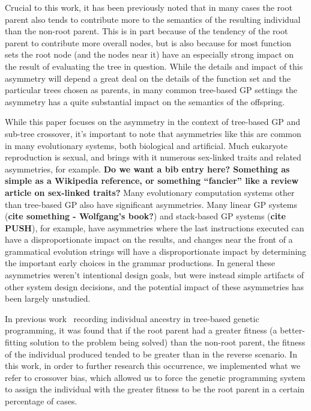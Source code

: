 \documentclass{sig-alternate}
\begin{document}
Crucial to this work, it has been previously noted \cite{McPheeDonatucciDramdahl:2014, McPhee:2008:SBB:
1792694.1792707} that in many cases the root parent also tends to contribute more to the semantics of the resulting 
individual than the non-root parent. This is in part because of the tendency of the root parent to contribute more 
overall nodes, but is also because for most function sets the root node (and the nodes near it) have an especially 
strong impact on the result of evaluating the tree in question. While the details and impact of this asymmetry will 
depend a great deal on the details of the function set and the particular trees chosen as parents, in many common 
tree-based GP settings the asymmetry has a quite substantial impact on the semantics of the offspring.

While this paper focuses on the asymmetry in the context of tree-based GP and sub-tree crossover, it's important to 
note that asymmetries like this are common in many evolutionary systems, both biological and artificial. Much 
eukaryote reproduction is sexual, and brings with it numerous sex-linked traits and related asymmetries, for example. 
\textbf{Do we want a bib entry here? Something as simple as a Wikipedia reference, or something ``fancier'' like a 
review article on sex-linked traits?} Many evolutionary computation systems other than tree-based GP also have 
significant asymmetries. Many linear GP systems (\textbf{cite something - Wolfgang's book?}) and stack-based GP 
systems (\textbf{cite PUSH}), for example, have asymmetries where the last instructions executed can have a 
disproportionate impact on the results, and changes near the front of a grammatical evolution strings will have a 
disproportionate impact by determining the important early choices in the grammar productions. In general these 
asymmetries weren't intentional design goals, but were instead simple artifacts of other system design decisions, and 
the potential impact of these asymmetries has been largely unstudied.

In previous work~\cite{McPheeDonatucciDramdahl:2014} recording individual ancestry in tree-based genetic 
programming,
it was found that if the root parent had a greater fitness (a better-fitting solution to the problem being solved) than
the non-root parent, the fitness of the individual produced tended to be greater than in the reverse scenario. In this
work, in order to further research this occurrence, we implemented what we refer to crossover bias, which allowed us 
to
force the genetic programming system to assign the individual with the greater fitness to be the root parent in a
certain percentage of cases.
\end{document}

